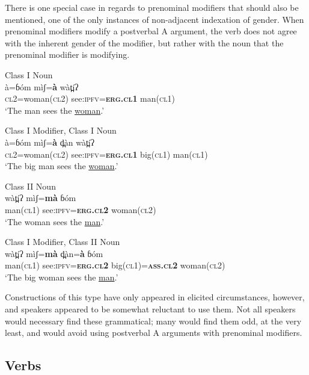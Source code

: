 \documentclass[output=collectionpaper,hidelinks]{langscibook}
\theoremstyle{remark}
\begin{document}
There is one special case in regards to prenominal modifiers that should also be mentioned, one of the only instances of non-adjacent indexation of gender. When
prenominal modifiers modify a postverbal A argument, the verb does not agree
with the inherent gender of the modifier, but rather with the noun that the
prenominal modifier is modifying.

\ea
 Class I Noun \\
\gll à=ɓóm mìʃ=\textbf{à} wàt̪íʔ \\
 \textsc{cl2}=woman(\textsc{cl2}) see:\textsc{ipfv}=\textbf{\textsc{erg.cl1}} man(\textsc{cl1}) \\
\glt `The man sees the \uline{woman}.' \\
\z

\ea
 Class I Modifier, Class I Noun \\
\gll à=ɓóm mìʃ=\textbf{à} d̪àn wàt̪íʔ \\
 \textsc{cl2}=woman(\textsc{cl2}) see:\textsc{ipfv}=\textbf{\textsc{erg.cl1}} big(\textsc{cl1}) man(\textsc{cl1}) \\
\glt `The big man sees the \uline{woman}.' \\
\z

\ea
 Class II Noun \\
\gll wàt̪íʔ mìʃ=\textbf{mà} ɓóm \\
 man(\textsc{cl1}) see:\textsc{ipfv}=\textbf{\textsc{erg.cl2}} woman(\textsc{cl2}) \\
\glt `The woman sees the \uline{man}.' \\
\z

\ea
 Class I Modifier, Class II Noun \\
\gll wàt̪íʔ mìʃ=\textbf{mà} d̪àn=\textbf{à} ɓóm \\
 man(\textsc{cl1}) see:\textsc{ipfv}=\textbf{\textsc{erg.cl2}} big(\textsc{cl1})=\textbf{\textsc{ass.cl2}} woman(\textsc{cl2}) \\
\glt `The big woman sees the \uline{man}.' \\
\z

Constructions of this type have only appeared in elicited circumstances,
however, and speakers appeared to be somewhat reluctant to use them.  Not all
 speakers would necessary find these grammatical; many would find them odd,
at the very least, and would avoid using postverbal A arguments with prenominal
modifiers.

\subsection{Verbs}
\label{sec:Don:Verbs}
\end{document}
